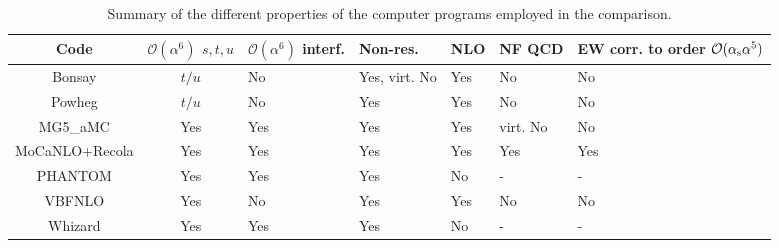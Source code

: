 \begin{table*}[ht!]
    \footnotesize
    \begin{tabularx}{\textwidth}{c|c|X|X|X|X|X}
        Code  &  $\mathcal O(\alpha^6)$ $s, t, u$  &  $\mathcal O(\alpha^6)$ interf.  &  Non-res.  & NLO &  NF QCD  &  EW corr. to order $\mathcal O(\alpha_\text{s} \alpha^5)$  \\
        \hline
        \hline
        {\sc Bonsay}        &  $t/u$    &  No       &  Yes, virt. No    &  Yes   & No       &  No  \\
        {\sc Powheg}        &  $t/u$    &  No       &  Yes              &  Yes   & No       &  No  \\
        {\sc MG5\_aMC}      &  Yes      &  Yes      &  Yes              &  Yes   & virt. No &  No \\
        {\sc MoCaNLO+Recola}&  Yes      &  Yes      &  Yes              &  Yes   & Yes      &  Yes  \\
        {\sc PHANTOM}       &  Yes      &  Yes      &  Yes              &  No    & -        & - \\
        {\sc VBFNLO}        &  Yes      &  No       &  Yes              &  Yes   & No       &  No  \\
        {\sc Whizard}       &  Yes      &  Yes      &  Yes              &  No    & -        & - \\
    \end{tabularx}
    \caption{\label{tab:wg1_codes} Summary of the different properties of the computer programs employed in the comparison.}
\end{table*}
